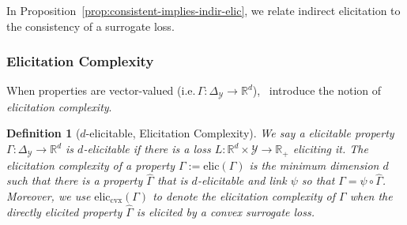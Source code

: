 \documentclass{article}
\newcommand{\reals}{\mathbb{R}}
\newcommand{\simplex}{\Delta_\Y}
\newcommand{\elic}{\mathrm{elic}}
\newcommand{\eliccvx}{\mathrm{elic}_\mathrm{cvx}}
\newcommand{\R}{\mathcal{R}}
\newcommand{\Y}{\mathcal{Y}}
\newtheorem{definition}{Definition}
\begin{document}
In Proposition~\ref{prop:consistent-implies-indir-elic}, we relate indirect elicitation to the consistency of a surrogate loss.

\subsubsection{Elicitation Complexity}\label{subsec:elic-cplx}
When properties are vector-valued (i.e.$\, \Gamma: \simplex \to \reals^d$),~\cite{frongillo2015elicitation} introduce the notion of \emph{elicitation complexity}.

\begin{definition}[$d$-elicitable, Elicitation Complexity]
	We say a elicitable property $\Gamma:\simplex \to \reals^d$ is $d$-elicitable if there is a loss $L : \reals^d \times \Y \to \reals_+$ eliciting it.
	The \emph{elicitation complexity} of a property $\Gamma := \elic(\Gamma)$ is the minimum dimension $d$ such that there is a property $\hat \Gamma$ that is $d$-elicitable and link $\psi$ so that $\Gamma = \psi \circ \hat \Gamma$.
	Moreover, we use $\eliccvx(\Gamma)$ to denote the elicitation complexity of $\Gamma$ when the directly elicited property $\hat \Gamma$ is elicited by a \emph{convex} surrogate loss.
\end{definition}


\iffalse
\begin{definition}[Identifiable]
	A property $\Gamma: \simplex \to \R$ is \emph{identifiable} if there is a function $V: \R \times\Y \to \reals$ such that 
	\begin{equation*}
	\forall p \in \simplex, \; r \in \Gamma(p) \iff V(r) = \vec 0~.~
	\end{equation*}
\end{definition}
\fi

\iffalse
Similarly, we can consider the notion of \emph{identifiability} for vector-valued properties.

\begin{definition}[$d$-identifiable, Identification Complexity]
	A vector-valued property $\Gamma: \simplex \to \reals^d$ is $d$-identifiable if it holds that $p \in \Gamma_u \iff V(u, p) = \vec 0 \in \reals^d$.
	Like elicitation complexity, we define the \emph{identification complexity} of a property $\Gamma$ as the minimum dimension $d$ such that there is a link $\psi$ such that $\Gamma = \psi \circ \hat \Gamma$ and $\hat \Gamma$ is $d$-identifiable.
\end{definition}
\fi
\end{document}
